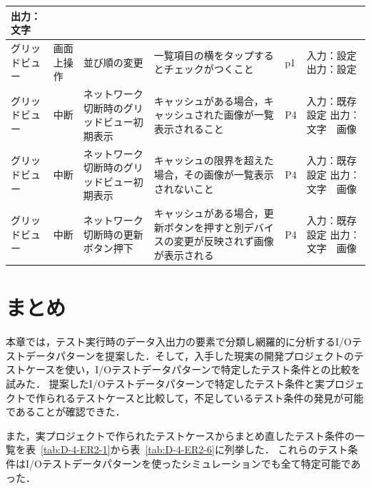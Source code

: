 \begin{table}[htbp]
\begin{tabular}{|p{8em}|p{7em}|p{9em}|p{9em}|p{3em}|p{12em}|}
出力：文字 \bigstrut\\
    \hline
    \multicolumn{1}{|l|}{グリッドビュー} & 画面上操作 & 並び順の変更 & 一覧項目の横をタップするとチェックがつくこと & p1    & 入力：設定
出力：設定 \bigstrut\\
    \hline
    グリッドビュー & 中断    & ネットワーク切断時のグリッドビュー初期表示 & キャッシュがある場合，キャッシュされた画像が一覧表示されること & P4    & 入力：既存設定
出力：文字　画像 \bigstrut\\
    \hline
    グリッドビュー & 中断    & ネットワーク切断時のグリッドビュー初期表示 & キャッシュの限界を超えた場合，その画像が一覧表示されないこと & P4    & 入力：既存設定
出力：文字　画像 \bigstrut\\
    \hline
    グリッドビュー & 中断    & ネットワーク切断時の更新ボタン押下 & キャッシュがある場合，更新ボタンを押すと別デバイスの変更が反映されず画像が表示される & P4    & 入力：既存設定
出力：文字　画像 \bigstrut\\
    \hline
    \end{tabular}%
    \label{tab:D-4-ER-4}%
  \end{table}%

  \newpage
  \section{まとめ}
  本章では，テスト実行時のデータ入出力の要素で分類し網羅的に分析するI/Oテストデータパターンを提案した．そして，入手した現実の開発プロジェクトのテストケースを使い，I/Oテストデータパターンで特定したテスト条件との比較を試みた．
  提案したI/Oテストデータパターンで特定したテスト条件と実プロジェクトで作られるテストケースと比較して，不足しているテスト条件の発見が可能であることが確認できた．

  また，実プロジェクトで作られたテストケースからまとめ直したテスト条件の一覧を表~\ref{tab:D-4-ER2-1}から表~\ref{tab:D-4-ER2-6}に列挙した．
  これらのテスト条件はI/Oテストデータパターンを使ったシミュレーションでも全て特定可能であった．


